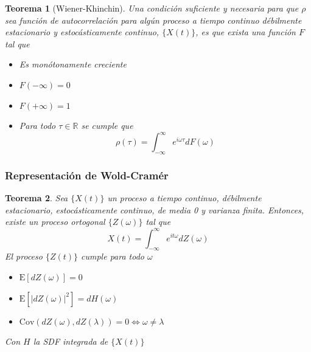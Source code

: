 \documentclass{beamer}
\newtheorem{thrm}{Teorema}
\newcommand{\R}{\mathbb{R}}
\newcommand{\intR}{\int_{-\infty}^{\infty}}
\newcommand{\E}[1]{\mathrm{E}\left[ #1 \right]}
\newcommand{\Cov}[1]{\mathrm{Cov}\left( #1 \right)}
\newcommand{\abso}[1]{\left| #1 \right|}
\begin{document}

\begin{frame}%
\begin{thrm}[Wiener-Khinchin]
Una condici\'on suficiente y necesaria para que $\rho$ sea funci\'on de autocorrelaci\'on para 
alg\'un proceso a tiempo continuo d\'ebilmente estacionario y estoc\'asticamente continuo, 
$\{X(t)\}$,  es que exista una funci\'on $F$ tal que
\begin{itemize}
\item Es mon\'otonamente creciente
\item $F(-\infty) = 0$
\item $F(+\infty) = 1$
\item Para todo $\tau \in \R$ se cumple que
\begin{equation*}
\rho(\tau) = \intR e^{i \omega \tau} dF(\omega)
\end{equation*}
\end{itemize}
\end{thrm}
\end{frame}


\begin{frame}\frametitle{Representaci\'on de Wold-Cram\'er}
\begin{thrm}
Sea $\{X(t)\}$ un proceso a tiempo continuo, d\'ebilmente estacionario, estoc\'asticamente 
continuo, de media 0 y varianza finita. Entonces, existe un proceso ortogonal $\{Z(\omega)\}$ tal 
que
\begin{equation*}
X(t) = \intR e^{i t \omega} dZ(\omega)
\end{equation*}
El proceso $\{Z(t)\}$ cumple para todo $\omega$
\begin{itemize}
\item $\E{dZ(\omega)} = 0$
\item $\E{\abso{dZ(\omega)}^{2}} = dH(\omega)$
\item $\Cov{dZ(\omega),dZ(\lambda)} = 0 \Leftrightarrow \omega \neq \lambda$
\end{itemize}
Con $H$ la SDF integrada de $\{X(t)\}$
\end{thrm}
\end{frame}
\end{document}
